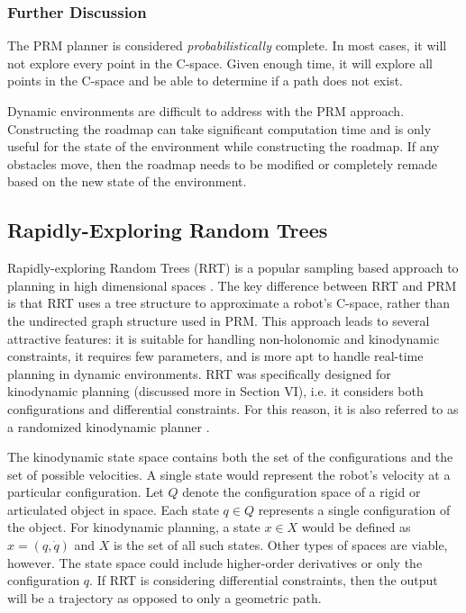 \documentclass[10pt,conference]{ieeeconf}
\begin{document}
\subsubsection{Further Discussion}

The PRM planner is considered \emph{probabilistically} complete. In most cases, it will not explore every point in the C-space. Given enough time, it will explore all points in the C-space and be able to determine if a path does not exist. 

Dynamic environments are difficult to address with the PRM approach. Constructing the roadmap can take significant computation time and is only useful for the state of the environment while constructing the roadmap. If any obstacles move, then the roadmap needs to be modified or completely remade based on the new state of the environment.


\subsection{Rapidly-Exploring Random Trees}

Rapidly-exploring Random Trees (RRT) is a popular sampling based approach to planning in high dimensional spaces \cite{RRT}. The key difference between RRT and PRM is that RRT uses a tree structure to approximate a robot's C-space, rather than the undirected graph structure used in PRM. This approach leads to several attractive features: it is suitable for handling non-holonomic and kinodynamic constraints, it requires few parameters, and is more apt to handle real-time planning in dynamic environments. RRT was specifically designed for kinodynamic planning (discussed more in Section VI), i.e. it considers both configurations and differential constraints. For this reason, it is also referred to as a randomized kinodynamic planner \cite{lavalle2001randomized}.  

The kinodynamic state space contains both the set of the configurations and the set of possible velocities. A single state would represent the robot's velocity at a particular configuration. Let $Q$ denote the configuration space of a rigid or articulated object in space. Each state $q \in Q$ represents a single configuration of the object. For kinodynamic planning, a state $x \in X$ would be defined as $x=(q,\dot{q})$ and $X$ is the set of all such states. Other types of spaces are viable, however. The state space could include higher-order derivatives or only the configuration $q$. If RRT is considering differential constraints, then the output will be a trajectory as opposed to only a geometric path.
\end{document}
